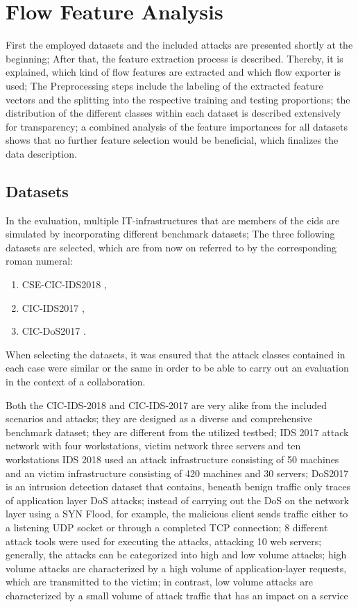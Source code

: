 \documentclass[../../main.tex]{subfiles}
\begin{document}
\section{Flow Feature Analysis}
First the employed datasets and the included attacks are presented shortly at the beginning; After that, the feature extraction process is described. Thereby, it is explained, which kind of flow features are extracted and which flow exporter is used; The Preprocessing steps include the labeling of the extracted feature vectors and the splitting into the respective training and testing proportions; the distribution of the different classes within each dataset is described extensively for transparency; a combined analysis of the feature importances for all datasets shows that no further feature selection would be beneficial, which finalizes the data description.
  

\subsection{Datasets}

In the evaluation, multiple IT-infrastructures that are members of the cids are simulated by incorporating different benchmark datasets; The three following datasets are selected, which are from now on referred to by the corresponding roman numeral:

\begin{enumerate}
    \item[\RomanNumeralCaps{1}] CSE-CIC-IDS2018 \cite{cse-cic-ids-2018},
    \item[\RomanNumeralCaps{2}] CIC-IDS2017 \cite{sharafaldin_toward_2018},
    \item[\RomanNumeralCaps{3}] CIC-DoS2017 \cite{jazi2017detecting}.
\end{enumerate}

When selecting the datasets, it was ensured that the attack classes contained in each case were similar or the same in order to be able to carry out an evaluation in the context of a collaboration.

Both the CIC-IDS-2018 and CIC-IDS-2017 are very alike from the included scenarios and attacks; they are designed as a diverse and comprehensive benchmark dataset; they are different from the utilized testbed; 
IDS 2017 attack network with four workstations, victim network three servers and ten workstations
IDS 2018 used an attack infrastructure consisting of 50 machines and an victim infrastructure consisting of 420 machines and 30 servers;
DoS2017 is an intrusion detection dataset that contains, beneath benign traffic only traces of application layer DoS attacks; instead of carrying out the DoS on the network layer using a SYN Flood, for example, the malicious client sends traffic either to a listening UDP socket or through a completed TCP connection; 8 different attack tools were used for executing the attacks, attacking 10 web servers; generally, the attacks can be categorized into high and low volume attacks; high volume attacks are characterized by a high volume of application-layer requests, which are transmitted to the victim; in contrast, low volume attacks are characterized by a small volume of attack traffic that has an impact on a service
\end{document}
